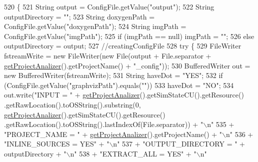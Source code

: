 \begin{DoxyCode}
520                                       \{
521         String output = ConfigFile.getValue(\textcolor{stringliteral}{"output"});
522         String outputDirectory = \textcolor{stringliteral}{""};
523         String doxygenPath = ConfigFile.getValue(\textcolor{stringliteral}{"doxygenPath"});
524         String imgPath = ConfigFile.getValue(\textcolor{stringliteral}{"imgPath"});
525         \textcolor{keywordflow}{if} (imgPath == null)    imgPath = \textcolor{stringliteral}{""};
526         \textcolor{keywordflow}{else}    outputDirectory = output;
527         \textcolor{comment}{//creatingConfigFile}
528         \textcolor{keywordflow}{try} \{
529             FileWriter fstreamWrite = \textcolor{keyword}{new} FileWriter(\textcolor{keyword}{new} File(output + File.separator + 
      \hyperlink{classit_1_1isislab_1_1masonhelperdocumentation_1_1analizer_1_1_global_utility_af6bcca0c06ec6fa8c2b2b88f5050914c}{getProjectAnalizer}().getProjectName() + \textcolor{stringliteral}{"\_config"}));
530             BufferedWriter out = \textcolor{keyword}{new} BufferedWriter(fstreamWrite);
531             String haveDot = \textcolor{stringliteral}{"YES"};
532             \textcolor{keywordflow}{if} (ConfigFile.getValue(\textcolor{stringliteral}{"graphvizPath"}).equals(\textcolor{stringliteral}{""}))
533                 haveDot = \textcolor{stringliteral}{"NO"};
534             out.write(\textcolor{stringliteral}{"INPUT = "} + \hyperlink{classit_1_1isislab_1_1masonhelperdocumentation_1_1analizer_1_1_global_utility_af6bcca0c06ec6fa8c2b2b88f5050914c}{getProjectAnalizer}().getSimStateCU().getResource()
      .getRawLocation().toOSString().substring(0, \hyperlink{classit_1_1isislab_1_1masonhelperdocumentation_1_1analizer_1_1_global_utility_af6bcca0c06ec6fa8c2b2b88f5050914c}{getProjectAnalizer}().getSimStateCU().getResource()
      .getRawLocation().toOSString().lastIndexOf(File.separator)) + \textcolor{stringliteral}{"\(\backslash\)n"}
535                     + \textcolor{stringliteral}{"PROJECT\_NAME = "} + \hyperlink{classit_1_1isislab_1_1masonhelperdocumentation_1_1analizer_1_1_global_utility_af6bcca0c06ec6fa8c2b2b88f5050914c}{getProjectAnalizer}().getProjectName() + \textcolor{stringliteral}{"\(\backslash\)n"}
536                     + \textcolor{stringliteral}{"INLINE\_SOURCES = YES"} + \textcolor{stringliteral}{"\(\backslash\)n"}
537                     + \textcolor{stringliteral}{"OUTPUT\_DIRECTORY = "} + outputDirectory + \textcolor{stringliteral}{"\(\backslash\)n"}
538                     + \textcolor{stringliteral}{"EXTRACT\_ALL = YES"} + \textcolor{stringliteral}{"\(\backslash\)n"}

\end{DoxyCode}

